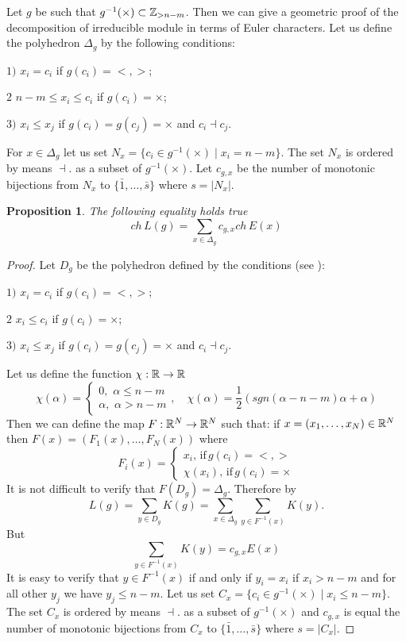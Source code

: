 \documentclass[12pt,reqno]{amsart}
\newtheorem{proposition}[thm]{Proposition}
\begin{document}
 Let $g$ be such that $g^{-1}(\times)\subset\Bbb Z_{>n-m}$. Then we can give a geometric proof of the decomposition of irreducible module in terms of Euler characters. Let us define the polyhedron   $\Delta_g$  by the following conditions:

$1)$  $x_i=c_i$ if $g(c_i)=<,>$; 

$2$ $n-m\le x_i\le c_i$ if $g(c_i)=\times$;

$3)$ $x_i\le x_j$ if $g(c_i)=g(c_j)=\times$  and $c_i\dashv c_j.$ 

For  $x\in \Delta_{g}$  let us set $N_x=\{c_i\in g^{-1}(\times)\mid x_i=n-m\}$. The set $N_x$  is ordered   by means $\dashv$.  as a subset of $g^{-1}(\times)$. Let   $c_{g,x} $  be  the number of  monotonic bijections from $N_x$ to $\{\bar1,\dots,\bar s\}$ where $s=|N_x|$.

\begin{proposition}  

 The  following equality holds true
$$
ch\,L(g)=\sum_{x\in \Delta_g}c_{g,x}ch\,E(x)
$$
\end{proposition}
\begin{proof} Let $D_g$ be the polyhedron defined by the conditions  (see \cite{Ser}):

$1)$  $x_i=c_i$ if $g(c_i)=<,>$; 

$2$ $x_i\le c_i$ if $g(c_i)=\times$;

$3)$ $x_i\le x_j$ if $g(c_i)=g(c_j)=\times$  and $c_i\dashv c_j.$

Let us define the function $\chi  :\Bbb R\rightarrow \Bbb R$
$$
\chi(\alpha)=\begin{cases} 0,\,\, \alpha\le n-m\\
\alpha,\,\, \alpha >n-m
\end{cases},\quad \chi(\alpha)=\frac12(sgn(\alpha-n-m)\alpha+\alpha)
$$
Then we can define the map $F:\Bbb R^N\rightarrow \Bbb R^{N}$ such that: if $x=(x_1,\dots,x_N)\in \Bbb R^N$ then
$ F(x)=(F_1(x),\dots,F_N(x)) $ where
$$
F_i(x)=\begin{cases}x_i,\,\text{if}\, g(c_i)=<,>\\
\chi(x_i),\, \text{if}\, g(c_i)=\times
\end{cases}
$$
 It is not difficult to verify that $F(D_g)=\Delta_g$.
 Therefore  by \cite{Ser}
 $$
 L(g)=\sum_{y\in D_g}K(g)=\sum_{x\in\Delta_g}\sum_{y\in F^{-1}(x)}K(y).
 $$
 But 
 $$
 \sum_{y\in F^{-1}(x)}K(y)=c_{g,x}E(x)
 $$
 It is easy to verify  that $y\in F^{-1}(x)$  if and only if $y_i=x_i$ if $x_i>n-m$ and  for all other $y_j$  we have $y_j\le n-m$.  Let us set $C_x=\{c_i\in g^{-1}(\times)\mid x_i\le n-m\}$. The set $C_x$  is ordered   by means $\dashv$.  as a subset of $g^{-1}(\times)$ and $c_{g,x} $ is equal the number of  monotonic bijections from $C_x$ to $\{\bar1,\dots,\bar s\}$ where $s=|C_x|$.

\end{proof}
\end{document}
